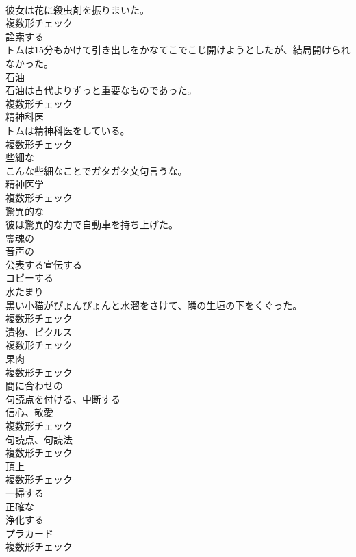 \documentclass[8pt]{extreport}
\begin{document}
\begin{CJK}{UTF8}{min}
\\	彼女は花に殺虫剤を振りまいた。	
\\	複数形チェック
\\	[動詞]	詮索する	
\\	トムは15分もかけて引き出しをかなてこでこじ開けようとしたが、結局開けられなかった。	
\\	[名詞]	石油	
\\	石油は古代よりずっと重要なものであった。	
\\	複数形チェック
\\	[名詞]	精神科医	
\\	トムは精神科医をしている。	
\\	複数形チェック
\\	[形容詞]	些細な	
\\	こんな些細なことでガタガタ文句言うな。	
\\	[名詞]	精神医学	
\\	複数形チェック
\\	[形容詞]	驚異的な	
\\	彼は驚異的な力で自動車を持ち上げた。	
\\	[形容詞]	霊魂の	
\\	[形容詞]	音声の	
\\	[動詞]	公表する宣伝する	
\\	[動詞]	コピーする	
\\	[名詞]	水たまり	
\\	黒い小猫がぴょんぴょんと水溜をさけて、隣の生垣の下をくぐった。	
\\	複数形チェック
\\	[名詞]	漬物、ピクルス	
\\	複数形チェック
\\	[名詞]	果肉	
\\	複数形チェック
\\	[形容詞]	間に合わせの	
\\	[動詞]	句読点を付ける、中断する	
\\	[名詞]	信心、敬愛	
\\	複数形チェック
\\	[名詞]	句読点、句読法	
\\	複数形チェック
\\	[名詞]	頂上	
\\	複数形チェック
\\	[動詞]	一掃する	
\\	[形容詞]	正確な	
\\	[動詞]	浄化する	
\\	[名詞]	プラカード	
\\	複数形チェック

\end{CJK}
\end{document}
